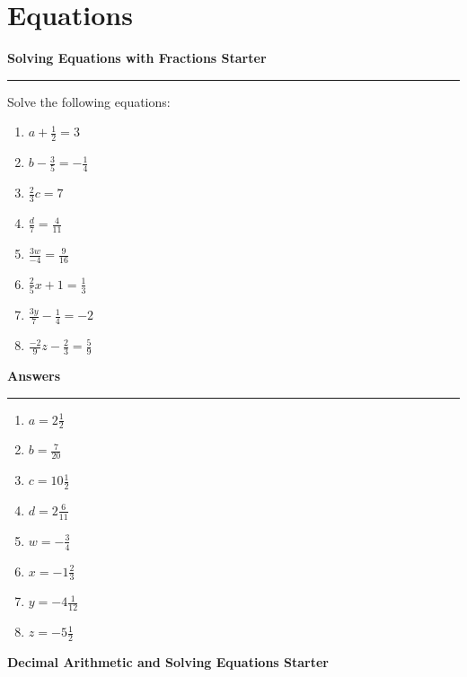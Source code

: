 \documentclass[12pt]{article}
\begin{document}
\section{Equations}

\newpage

\noindent \textbf{Solving Equations with Fractions Starter}

\medskip

\hrule 

\medskip

\noindent Solve the following equations:

\begin{enumerate}
    \item \( a + \frac{1}{2} = 3\)
    \item \(b - \frac{3}{5} = - \frac{1}{4}\)
    \item \( \frac{2}{3} c = 7 \)
    \item \( \frac{d}{7} = \frac{4}{11} \)
    \item \( \frac{3w}{-4} = \frac{9}{16} \)
    \item \( \frac{2}{5}x+1 =\frac{1}{3} \)
    \item \( \frac{3y}{7}-\frac{1}{4} = -2\)
    \item \( \frac{-2}{9}z-\frac{2}{3} = \frac{5}{9}\)
\end{enumerate}

\newpage

\noindent \textbf{Answers}

\medskip

\hrule 

\medskip

\begin{enumerate}
    \item \(a=2\frac{1}{2}\)
    \item \(b=\frac{7}{20}\)
    \item \(c=10\frac{1}{2}\)
    \item \(d=2\frac{6}{11}\)
    \item \(w=-\frac{3}{4}\)
    \item \(x = -1\frac{2}{3}\)
    \item \(y=-4\frac{1}{12}\)
    \item \(z=-5\frac{1}{2}\)
\end{enumerate}

\newpage

\noindent \textbf{Decimal Arithmetic and Solving Equations Starter}

\medskip
\end{document}

